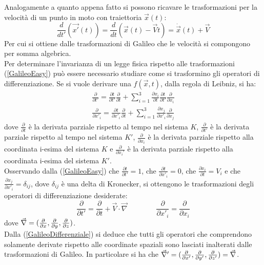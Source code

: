 Analogamente a quanto appena fatto si possono ricavare le trasformazioni per la velocità di un punto in moto con traiettoria $\vec{x}(t)$:
\begin{equation}
	\frac{d}{dt'}(\vec{x'}(t))=\frac{d}{dt}(\vec{x}(t)-\vec{V}t)=\dot{\vec{x}}(t)+\vec{V}
\end{equation}
Per cui si ottiene dalle trasformazioni di Galileo che le velocità si compongono per somma algebrica.\\

Per determinare l'invarianza di un legge fisica rispetto alle trasformazioni (\ref{GalileoEasy}) può essere necessario 
studiare come si trasformino gli operatori di differenziazione. 
Se si vuole derivare una $f(\vec{x},t)$, dalla regola di Leibniz, si ha:
\begin{equation*}
	\begin{gathered}
		\frac{\partial}{\partial t'}=\frac{\partial t}{\partial t'}\frac{\partial}{\partial t}+
		\sum_{i=1}^{3}\frac{\partial x_i}{\partial t}\frac{\partial t}{\partial t'}
		\frac{\partial}{\partial x_i} \\
		\frac{\partial}{\partial x'_i}=\frac{\partial t}{\partial x'_i}\frac{\partial}{\partial t}+
		\sum_{i=1}^{3}\frac{\partial x_j}{\partial x'_i}\frac{\partial}{\partial x_j}
	\end{gathered}
\end{equation*}
dove $\frac{\partial}{\partial t}$ è la derivata parziale rispetto al tempo nel sistema $K$, $\frac{\partial}{\partial t'}$ è la derivata parziale rispetto al tempo nel sistema $K'$, $\frac{\partial}{\partial x_i}$ è la derivata parziale rispetto alla coordinata i-esima del sistema $K$ e $\frac{\partial}{\partial x_i'}$ è la derivata parziale rispetto alla coordinata i-esima del sistema $K'$.\\
Osservando dalla (\ref{GalileoEasy}) che $\frac{\partial t}{\partial t'}=1$, che 
$\frac{\partial t}{\partial x'_i}=0$, che $\frac{\partial x_i}{\partial t}=V_i$ e che 
$\frac{\partial x_j}{\partial x'_i}=\delta_{ij}$, dove $\delta_{ij}$ è una delta di Kronecker, 
si ottengono le trasformazioni degli operatori di differenziazione desiderate:
\begin{equation}
	\frac{\partial}{\partial t'}=\frac{\partial}{\partial t}+\vec{V}\cdot\vec{\nabla} \qquad \qquad
	\frac{\partial}{\partial x'_i}=\frac{\partial}{\partial x_i}
	\label{GalileoDifferenziale}
\end{equation}
dove $\vec{\nabla}=(\frac{\partial }{\partial x},\frac{\partial }{\partial y},\frac{\partial }{\partial z})$.\\
Dalla (\ref{GalileoDifferenziale}) si deduce che tutti gli operatori che comprendono solamente derivate 
rispetto alle coordinate spaziali sono lasciati inalterati dalle trasformazioni di Galileo. In particolare si ha che $\vec{\nabla}'=(\frac{\partial }{\partial x'},\frac{\partial }{\partial y'},\frac{\partial }{\partial z'})=\vec{\nabla}$.
